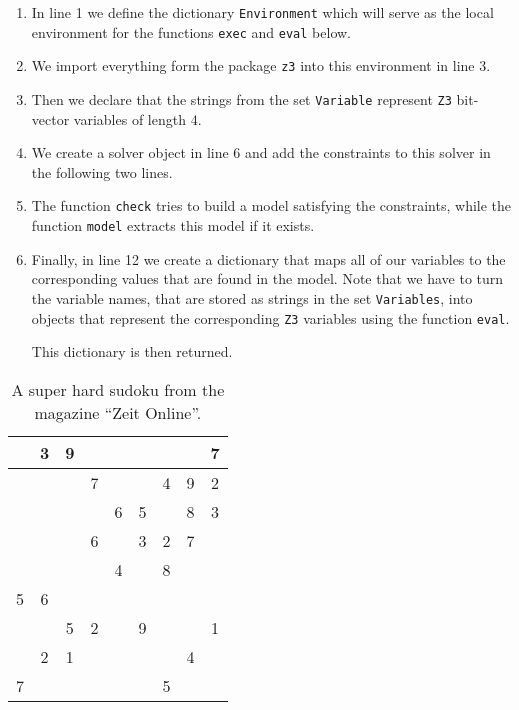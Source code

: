 \begin{enumerate}
\item In line 1 we define the dictionary \texttt{Environment}  which will serve as the local environment for
      the functions \texttt{exec} and \texttt{eval} below.
\item We import everything form the package \texttt{z3} into this environment in line 3.
\item Then we declare that the strings from the set \texttt{Variable} represent \texttt{Z3} bit-vector
      variables of length $4$.   
\item We create a solver object in line 6 and add the constraints to this solver in the following two lines.
\item The function \texttt{check} tries to build a model satisfying the constraints, while the function
      \texttt{model} extracts this model if it exists.
\item Finally, in line 12 we create a dictionary that maps all of our variables to the corresponding values that
      are found in the model.  Note that we have to turn the variable names, that are stored as strings in the set
      \texttt{Variables}, into objects that represent the corresponding \texttt{Z3} variables using the
      function \texttt{eval}.

      This dictionary is then returned.
\end{enumerate}

\begin{table}[h]
  \centering
  \begin{tabular}{||c|c|c||c|c|c||c|c|c||}
    \hline
    \hline
      & 3 & 9 &   &   &   &   &   & 7 \\
    \hline
      &   &   & 7 &   &   & 4 & 9 & 2 \\
    \hline
      &   &   &   & 6 & 5 &   & 8 & 3 \\
    \hline
    \hline
      &   &   & 6 &   & 3 & 2 & 7 &   \\
    \hline
      &   &   &   & 4 &   & 8 &   &   \\
    \hline
    5 & 6 &   &   &   &   &   &   &   \\
    \hline
    \hline
      &   & 5 & 2 &   & 9 &   &   & 1 \\
    \hline
      & 2 & 1 &   &   &   &   & 4 &   \\
    \hline
    7 &   &   &   &   &   & 5 &   &   \\
    \hline
    \hline
  \end{tabular}
  \caption{A super hard sudoku from the magazine ``Zeit Online''.}
  \label{tab:sudoku}
\end{table}

